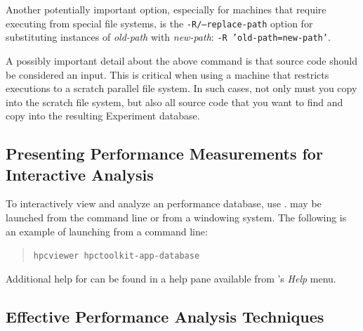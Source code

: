 \documentclass[11pt,letterpaper]{report}
\begin{document}
Another potentially important option, especially for machines that require executing from special file systems, is the \texttt{-R/--replace-path} option for substituting instances of \emph{old-path} with \emph{new-path}: \texttt{-R 'old-path=new-path'}.

A possibly important detail about the above command is that source code should be considered an \hpcprofAll{} input.
This is critical when using a machine that restricts executions to a scratch parallel file system.
In such cases, not only must you copy \hpcprofmpi{} into the scratch file system, but also all source code that you want \hpcprofmpi{} to find and copy into the resulting Experiment database.



\subsection{Presenting Performance Measurements for Interactive Analysis}

To interactively view and analyze an \HPCToolkit{} performance database, use \hpcviewer{}.
\hpcviewer{} may be launched from the command line or from a windowing system.
The following is an example of launching from a command line:
\begin{quote}
  \verb|hpcviewer hpctoolkit-app-database|
\end{quote}
Additional help for \hpcviewer{} can be found in a help pane available from \hpcviewer{}'s \emph{Help} menu.


\subsection{Effective Performance Analysis Techniques}
\end{document}
